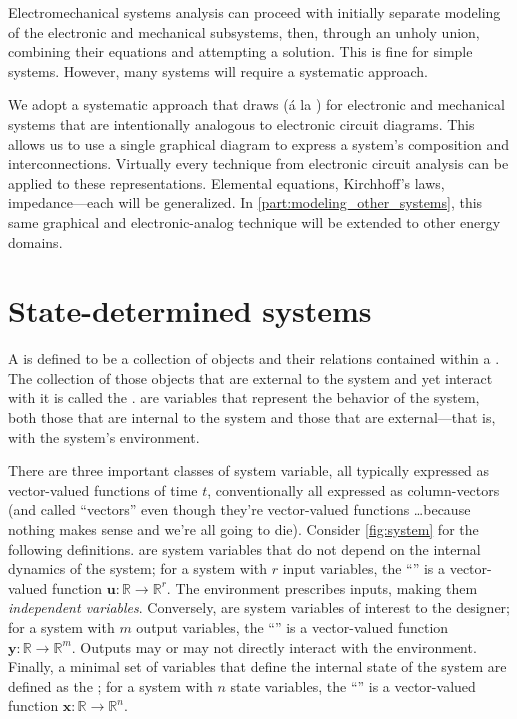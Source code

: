 \documentclass[dynamic_systems.tex]{subfiles}
\begin{document}
Electromechanical systems analysis can proceed with initially separate modeling of the electronic and mechanical subsystems, then, through an unholy union, combining their equations and attempting a solution.
This is fine for simple systems.
However, many systems will require a systematic approach.
\tags{}

We adopt a systematic approach that draws  (\'a la ) for electronic and mechanical systems that are intentionally analogous to electronic circuit diagrams.
This allows us to use a single graphical diagram to express a system's composition and interconnections.
Virtually every technique from electronic circuit analysis can be applied to these representations.
Elemental equations, Kirchhoff's laws, impedance---each will be generalized.
In \cref{part:modeling_other_systems}, this same graphical and electronic-analog technique will be extended to other energy domains.
\tags{}

\section{State-determined systems}
\tags{}

A  is defined to be a collection of objects and their relations contained within a .
The collection of those objects that are external to the system and yet interact with it is called the .
 are variables that represent the behavior of the system, both those that are internal to the system and those that are external---that is, with the system's environment.
\tags{}

There are three important classes of system variable, all typically expressed as vector-valued functions of time $t$, conventionally all expressed as column-vectors (and called ``vectors'' even though they're vector-valued functions \ldots because nothing makes sense and we're all going to die).
Consider \autoref{fig:system} for the following definitions.
 are system variables that do not depend on the internal dynamics of the system; for a system with $r$ input variables, the ``'' is a vector-valued function $\bm{u}:\mathbb{R}\rightarrow\mathbb{R}^r$.
The environment prescribes inputs, making them \emph{independent variables}.
Conversely,  are system variables of interest to the designer; for a system with $m$ output variables, the ``'' is a vector-valued function $\bm{y}:\mathbb{R}\rightarrow\mathbb{R}^m$.
Outputs may or may not directly interact with the environment.
Finally, a minimal set of variables that define the internal state of the system are defined as the ; for a system with $n$ state variables, the ``'' is a vector-valued function $\bm{x}:\mathbb{R}\rightarrow\mathbb{R}^n$.
\tags{}
\end{document}
